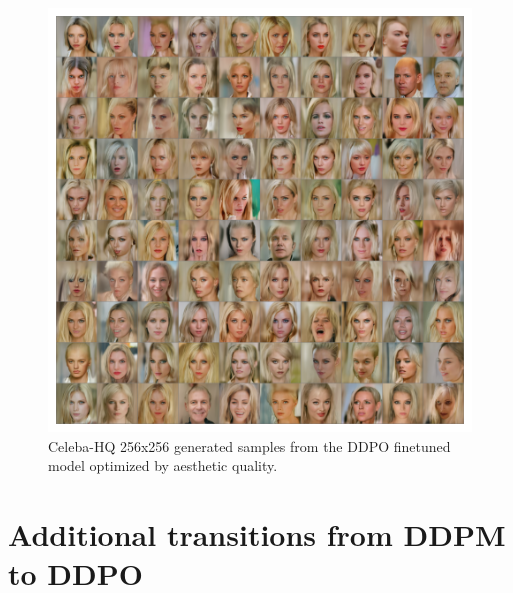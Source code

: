 \begin{appendixs}
        \begin{figure}
            \centering
            \includegraphics[scale=0.8]{img/results/ddpo-aesthetic-samples.png}
            \vspace{-4pt}  %
            \captionsetup{width=\textwidth} %
            \caption{Celeba-HQ 256x256 generated samples from the DDPO finetuned model optimized by aesthetic quality.}
            \label{fig:ddpo-aesthetic-samples}
        \end{figure}

    \newpage

    \section{Additional transitions from DDPM to DDPO}



\end{appendixs}
